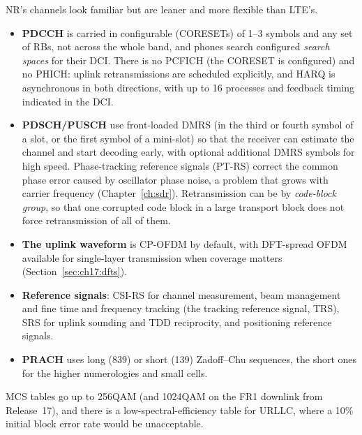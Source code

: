 
NR's channels look familiar but are leaner and more flexible than LTE's.
\begin{itemize}
\item \textbf{PDCCH} is carried in configurable  (CORESETs) of 1--3
symbols and any set of RBs, not across the whole band, and phones search configured \emph{search
spaces} for their DCI. There is no PCFICH (the CORESET is configured) and no PHICH: uplink
retransmissions are scheduled explicitly, and HARQ is asynchronous in both directions, with up to 16
processes and feedback timing indicated in the DCI.
\item \textbf{PDSCH/PUSCH} use front-loaded DMRS (in the third or fourth symbol of a slot, or the
first symbol of a mini-slot) so that the receiver can estimate the channel and start decoding early,
with optional additional DMRS symbols for high speed. Phase-tracking reference signals (PT-RS)
correct the common phase error caused by oscillator phase noise, a problem that grows with carrier
frequency (Chapter~\ref{ch:sdr}). Retransmission can be by \emph{code-block group}, so that one
corrupted code block in a large transport block does not force retransmission of all of them.
\item \textbf{The uplink waveform} is CP-OFDM by default, with DFT-spread OFDM available for
single-layer transmission when coverage matters (Section~\ref{sec:ch17:dfts}).
\item \textbf{Reference signals}: CSI-RS for channel measurement, beam management and fine time and
frequency tracking (the tracking reference signal, TRS), SRS for uplink sounding and TDD reciprocity,
and positioning reference signals.
\item \textbf{PRACH} uses long (839) or short (139) Zadoff--Chu sequences, the short ones for the
higher numerologies and small cells.
\end{itemize}
MCS tables go up to 256QAM (and 1024QAM on the FR1 downlink from Release~17), and there is a
low-spectral-efficiency table for URLLC, where a 10\% initial block error rate would be unacceptable.

